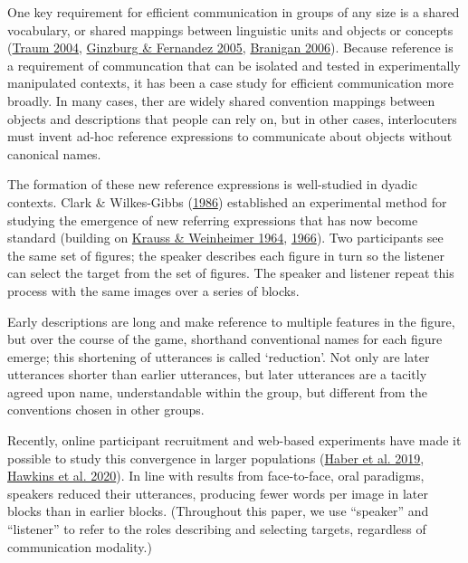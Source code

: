 \documentclass[
  english,
  a4paper,
]{article}
\begin{document}
One key requirement for efficient communication in groups of any size is a shared vocabulary, or shared mappings between linguistic units and objects or concepts (\protect\hyperlink{ref-traum2004}{Traum 2004}, \protect\hyperlink{ref-ginzburg2005}{Ginzburg \& Fernandez 2005}, \protect\hyperlink{ref-branigan2006}{Branigan 2006}). Because reference is a requirement of communcation that can be isolated and tested in experimentally manipulated contexts, it has been a case study for efficient communication more broadly. In many cases, ther are widely shared convention mappings between objects and descriptions that people can rely on, but in other cases, interlocuters must invent ad-hoc reference expressions to communicate about objects without canonical names.

The formation of these new reference expressions is well-studied in dyadic contexts. Clark \& Wilkes-Gibbs (\protect\hyperlink{ref-clarkReferringCollaborativeProcess1986}{1986}) established an experimental method for studying the emergence of new referring expressions that has now become standard (building on \protect\hyperlink{ref-kraussChangesReferencePhrases1964}{Krauss \& Weinheimer 1964}, \protect\hyperlink{ref-kraussConcurrentFeedbackConfirmation1966}{1966}). Two participants see the same set of figures; the speaker describes each figure in turn so the listener can select the target from the set of figures. The speaker and listener repeat this process with the same images over a series of blocks.

Early descriptions are long and make reference to multiple features in the figure, but over the course of the game, shorthand conventional names for each figure emerge; this shortening of utterances is called `reduction'. Not only are later utterances shorter than earlier utterances, but later utterances are a tacitly agreed upon name, understandable within the group, but different from the conventions chosen in other groups.

Recently, online participant recruitment and web-based experiments have made it possible to study this convergence in larger populations (\protect\hyperlink{ref-haber2019}{Haber et al. 2019}, \protect\hyperlink{ref-hawkinsCharacterizingDynamicsLearning2020}{Hawkins et al. 2020}). In line with results from face-to-face, oral paradigms, speakers reduced their utterances, producing fewer words per image in later blocks than in earlier blocks. (Throughout this paper, we use ``speaker'' and ``listener'' to refer to the roles describing and selecting targets, regardless of communication modality.)
\end{document}
